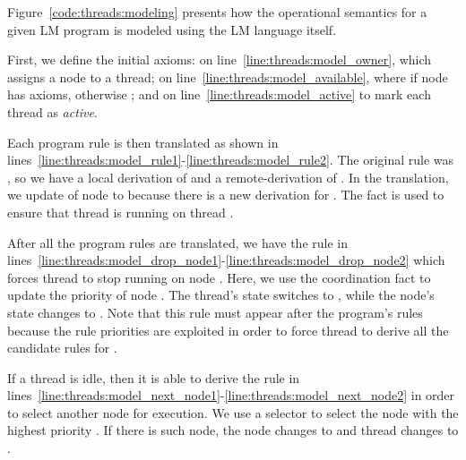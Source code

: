 Figure~\ref{code:threads:modeling} presents how the operational semantics for a
given LM program is modeled using the LM language itself.

First, we define the initial axioms:  on
line~\ref{line:threads:model_owner}, which assigns a node to a thread;
 on line~\ref{line:threads:model_available}, where
 if node  has axioms, otherwise ; and
 on line~\ref{line:threads:model_active} to mark each thread as
\emph{active}.

Each program rule is then translated as shown in
lines~\ref{line:threads:model_rule1}-\ref{line:threads:model_rule2}. The
original rule was , so we have a local derivation of  and a
remote-derivation of . In the translation, we update
 of node  to  because there is a new
derivation for . The fact  is used to ensure that
thread  is running on thread .

After all the program rules are translated, we have the rule in
lines~\ref{line:threads:model_drop_node1}-\ref{line:threads:model_drop_node2}
which forces thread  to stop running on node . Here, we use the
coordination fact  to update the priority of node
. The thread's state switches to , while the node's state
changes to . Note that this rule must appear after the
program's rules because the rule priorities are exploited in order to force
thread  to derive all the candidate rules for .

If a thread is idle, then it is able to derive the rule in
lines~\ref{line:threads:model_next_node1}-\ref{line:threads:model_next_node2} in
order to select another node for execution. We use a  selector to
select the node  with the highest priority . If there is such
node, the node changes to  and thread  changes to
.

